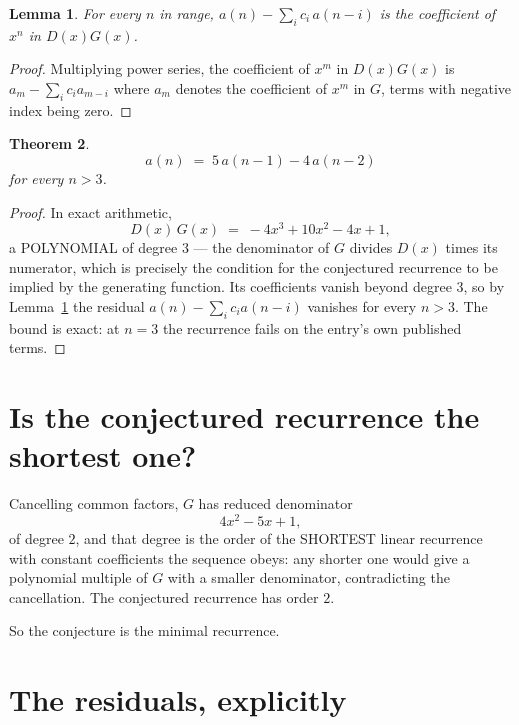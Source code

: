 \documentclass[11pt,a4paper]{article}
\theoremstyle{plain}
\newtheorem{theorem}{Theorem}
\newtheorem{lemma}[theorem]{Lemma}
\theoremstyle{definition}
\begin{document}
\begin{lemma}\label{lem:key}
For every $n$ in range, $a(n)-\sum_i c_i\,a(n-i)$ is the coefficient of $x^{n}$ in
$D(x)G(x)$.
\end{lemma}

\begin{proof}
Multiplying power series, the coefficient of $x^{m}$ in $D(x)G(x)$ is
$a_m-\sum_i c_i a_{m-i}$ where $a_m$ denotes the coefficient of $x^{m}$ in $G$, terms with
negative index being zero.
\end{proof}

\begin{theorem}
\[
a(n)\;=\;5\,a(n-1) - 4\,a(n-2)
\]
for every $n>3$.
\end{theorem}

\begin{proof}
In exact arithmetic,
\[
D(x)\,G(x)\;=\;- 4 x^{3} + 10 x^{2} - 4 x + 1,
\]
a POLYNOMIAL of degree $3$ --- the denominator of $G$ divides $D(x)$ times its numerator,
which is precisely the condition for the conjectured recurrence to be implied by the
generating function. Its coefficients vanish beyond degree $3$, so by
Lemma~\ref{lem:key} the residual $a(n)-\sum_ic_ia(n-i)$ vanishes for every
$n>3$. The bound is exact: at $n=3$ the recurrence fails on the entry's own published terms.
\end{proof}

\section{Is the conjectured recurrence the shortest one?}

Cancelling common factors, $G$ has reduced denominator
\[
4 x^{2} - 5 x + 1,
\]
of degree $2$, and that degree is the order of the SHORTEST linear recurrence with
constant coefficients the sequence obeys: any shorter one would give a polynomial multiple of
$G$ with a smaller denominator, contradicting the cancellation. The conjectured recurrence has
order $2$.

So the conjecture is the minimal recurrence.

\section{The residuals, explicitly}
\end{document}
